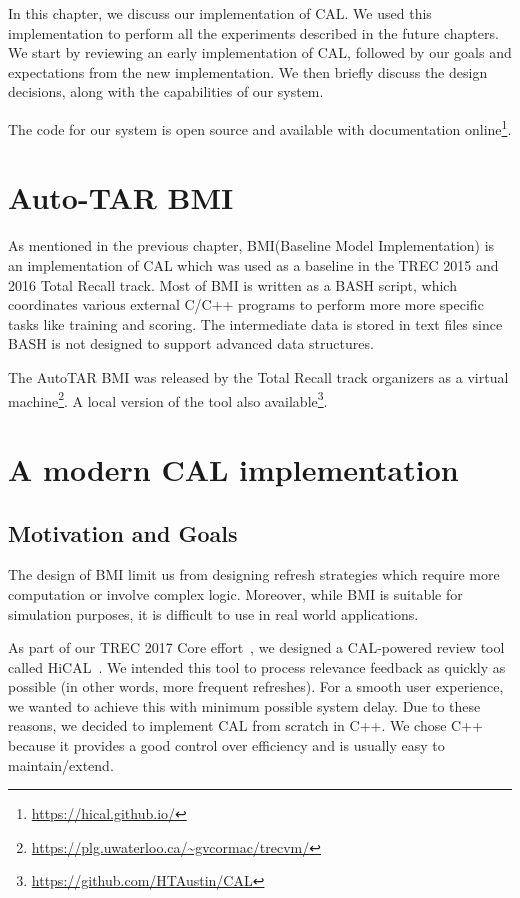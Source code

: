 \label{chap:implementation}
In this chapter, we discuss our implementation of CAL. We used this
implementation to perform all the experiments described in the future chapters.
We start by reviewing an early implementation of CAL, followed by our goals
and expectations from the new implementation. We then briefly discuss the
design decisions, along with the capabilities of our system.

The code for our system is open source and available with documentation
online\footnote{\url{https://hical.github.io/}}.

\section{Auto-TAR BMI}
As mentioned in the previous chapter,
BMI(Baseline Model
Implementation) is an implementation of CAL which was used as a baseline in the
TREC 2015 and 2016 Total Recall track. Most of BMI is written as
a BASH script, which coordinates various external C/C++ programs to perform more
more specific tasks like training and scoring. The intermediate data is
stored in text files since BASH is not designed to support advanced data
structures.

The AutoTAR BMI was released by the Total Recall track organizers as a virtual
machine\footnote{\url{https://plg.uwaterloo.ca/~gvcormac/trecvm/}}. A local
version of the tool also
available\footnote{\url{https://github.com/HTAustin/CAL}}.

\section{A modern CAL implementation}

\subsection{Motivation and Goals}
The design of BMI limit us from designing refresh strategies which require more
computation or involve complex logic. Moreover, while BMI is suitable for
simulation purposes, it is difficult to use in real world applications.

As part of our TREC 2017 Core effort~\cite{zhang2017uwaterloomds}, we designed a
CAL-powered review tool called HiCAL~\cite{sigirdemo}. We intended this tool to
process relevance feedback as quickly as possible (in other words, more frequent
refreshes). For a smooth user experience, we wanted to achieve this with minimum
possible system delay. Due to these reasons, we decided to implement CAL from
scratch in C++. We chose C++ because it provides a good control over efficiency
and is usually easy to maintain/extend.

